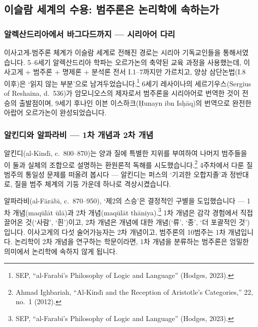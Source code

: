 \documentclass[12pt, a4paper]{article}
\begin{document}
\thispagestyle{firstpage}


\subsection{이슬람 세계의 수용: 범주론은 논리학에 속하는가}

\subsubsection{알렉산드리아에서 바그다드까지 --- 시리아어 다리}

이사고게-범주론 체계가 이슬람 세계로 전해진 경로는 시리아 기독교인들을 통해서였습니다. 5--6세기 알렉산드리아 학파는 오르가논의 축약된 교육 과정을 사용했는데, 이사고게 + 범주론 + 명제론 + 분석론 전서 I.1--7까지만 가르치고, 양상 삼단논법(I.8 이후)은 `읽지 않는 부분'으로 남겨두었습니다.\footnote{SEP, ``al-Farabi's Philosophy of Logic and Language'' (Hodges, 2023).} 6세기 레사이나의 세르기우스(Sergius of Reshaina, d.\ 536)가 암모니오스의 제자로서 범주론을 시리아어로 번역한 것이 전승의 출발점이며, 9세기 후나인 이븐 이스하크(\d{H}unayn ibn Is\d{h}\=aq)의 번역으로 완전한 아랍어 오르가논이 완성되었습니다.

\subsubsection{알킨디와 알파라비 --- 1차 개념과 2차 개념}

알킨디(al-Kind\=\i, c.\ 800--870)는 양과 질에 특별한 지위를 부여하여 나머지 범주들을 이 둘과 실체의 조합으로 설명하는 환원론적 독해를 시도했습니다.\footnote{Ahmad Ighbariah, ``Al-Kind\=\i{} and the Reception of Aristotle's Categories,''  22, no.\ 1 (2012).} 4주차에서 다룬 질 범주의 통일성 문제를 떠올려 봅시다 --- 알킨디는 퍼스의 `기괴한 오합지졸'과 정반대로, 질을 범주 체계의 기둥 가운데 하나로 격상시켰습니다.

알파라비(al-F\=ar\=ab\=\i, c.\ 870--950), `제2의 스승'은 결정적인 구별을 도입했습니다 --- 1차 개념(ma\textquotesingle q\=ul\=at \=ul\=a)과 2차 개념(ma\textquotesingle q\=ul\=at th\=aniya).\footnote{SEP, ``al-Farabi's Philosophy of Logic and Language'' (Hodges, 2023).} 1차 개념은 감각 경험에서 직접 끌어온 것(`사람', `흰')이고, 2차 개념은 개념에 대한 개념(`류', `종', `더 포괄적인 것')입니다. 이사고게의 다섯 술어가능자는 2차 개념이고, 범주론의 10범주는 1차 개념입니다. 논리학이 2차 개념을 연구하는 학문이라면, 1차 개념을 분류하는 범주론은 엄밀한 의미에서 논리학에 속하지 않게 됩니다.
\end{document}
